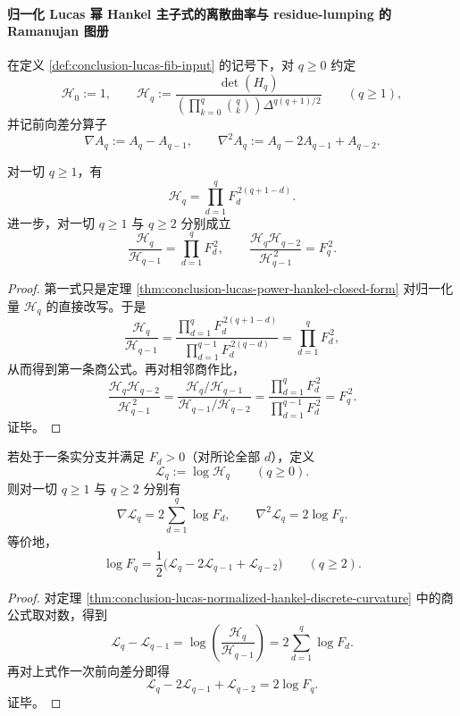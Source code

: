 \paragraph{归一化 Lucas 幂 Hankel 主子式的离散曲率与 residue-lumping 的 Ramanujan 图册}
在定义 \ref{def:conclusion-lucas-fib-input} 的记号下，对 \(q\ge 0\) 约定
\[
\mathcal H_0:=1,\qquad
\mathcal H_q:=
\frac{\det(H_q)}
{\left(\prod_{k=0}^{q}\binom{q}{k}\right)\Delta^{q(q+1)/2}}
\qquad (q\ge 1),
\]
并记前向差分算子
\[
\nabla A_q:=A_q-A_{q-1},
\qquad
\nabla^2A_q:=A_q-2A_{q-1}+A_{q-2}.
\]

\begin{theorem}\label{thm:conclusion-lucas-normalized-hankel-discrete-curvature}
对一切 \(q\ge 1\)，有
\[
\mathcal H_q=\prod_{d=1}^{q}F_d^{\,2(q+1-d)}.
\]
进一步，对一切 \(q\ge 1\) 与 \(q\ge 2\) 分别成立
\[
\frac{\mathcal H_q}{\mathcal H_{q-1}}
=
\prod_{d=1}^{q}F_d^{\,2},
\qquad
\frac{\mathcal H_q\mathcal H_{q-2}}{\mathcal H_{q-1}^{\,2}}
=
F_q^{\,2}.
\]
\end{theorem}
\begin{proof}
第一式只是定理 \ref{thm:conclusion-lucas-power-hankel-closed-form} 对归一化量 \(\mathcal H_q\) 的直接改写。于是
\[
\frac{\mathcal H_q}{\mathcal H_{q-1}}
=
\frac{\prod_{d=1}^{q}F_d^{\,2(q+1-d)}}
{\prod_{d=1}^{q-1}F_d^{\,2(q-d)}}
=
\prod_{d=1}^{q}F_d^{\,2},
\]
从而得到第一条商公式。再对相邻商作比，
\[
\frac{\mathcal H_q\mathcal H_{q-2}}{\mathcal H_{q-1}^{\,2}}
=
\frac{\mathcal H_q/\mathcal H_{q-1}}{\mathcal H_{q-1}/\mathcal H_{q-2}}
=
\frac{\prod_{d=1}^{q}F_d^{\,2}}{\prod_{d=1}^{q-1}F_d^{\,2}}
=
F_q^{\,2}.
\]
证毕。
\end{proof}

\begin{corollary}\label{cor:conclusion-lucas-log-fibonacci-from-hankel-curvature}
若处于一条实分支并满足 \(F_d>0\)（对所论全部 \(d\)），定义
\[
\mathcal L_q:=\log \mathcal H_q\qquad(q\ge 0).
\]
则对一切 \(q\ge 1\) 与 \(q\ge 2\) 分别有
\[
\nabla \mathcal L_q
=
2\sum_{d=1}^{q}\log F_d,
\qquad
\nabla^2\mathcal L_q
=
2\log F_q.
\]
等价地，
\[
\log F_q
=
\frac12\bigl(\mathcal L_q-2\mathcal L_{q-1}+\mathcal L_{q-2}\bigr)
\qquad(q\ge 2).
\]
\end{corollary}
\begin{proof}
对定理 \ref{thm:conclusion-lucas-normalized-hankel-discrete-curvature} 中的商公式取对数，得到
\[
\mathcal L_q-\mathcal L_{q-1}
=
\log\!\left(\frac{\mathcal H_q}{\mathcal H_{q-1}}\right)
=
2\sum_{d=1}^{q}\log F_d.
\]
再对上式作一次前向差分即得
\[
\mathcal L_q-2\mathcal L_{q-1}+\mathcal L_{q-2}
=
2\log F_q.
\]
证毕。
\end{proof}

